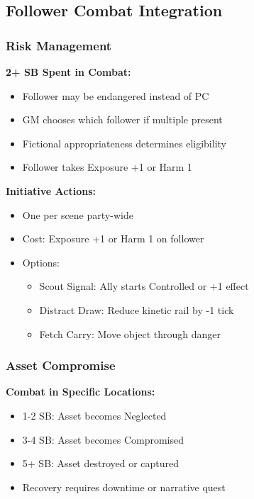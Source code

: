 \subsection{Follower Combat Integration}

\subsubsection{Risk Management}
\textbf{2+ SB Spent in Combat:}
\begin{itemize}[leftmargin=*]
    \item Follower may be endangered instead of PC
    \item GM chooses which follower if multiple present
    \item Fictional appropriateness determines eligibility
    \item Follower takes Exposure +1 or Harm 1
\end{itemize}

\textbf{Initiative Actions:}
\begin{itemize}[leftmargin=*]
    \item One per scene party-wide
    \item Cost: Exposure +1 or Harm 1 on follower
    \item Options:
    \begin{itemize}
        \item Scout Signal: Ally starts Controlled or +1 effect
        \item Distract Draw: Reduce kinetic rail by -1 tick
        \item Fetch Carry: Move object through danger
    \end{itemize}
\end{itemize}

\subsubsection{Asset Compromise}
\textbf{Combat in Specific Locations:}
\begin{itemize}[leftmargin=*]
    \item 1-2 SB: Asset becomes Neglected
    \item 3-4 SB: Asset becomes Compromised
    \item 5+ SB: Asset destroyed or captured
    \item Recovery requires downtime or narrative quest
\end{itemize}

